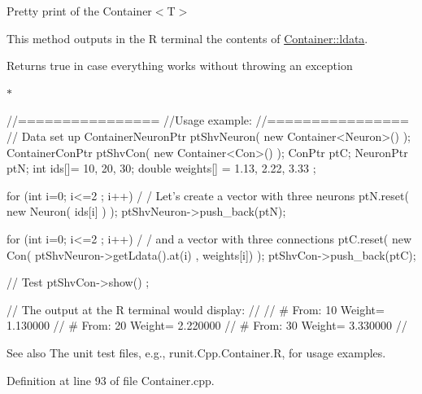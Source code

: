 Pretty print of the Container$<$T$>$ 

This method outputs in the R terminal the contents of \hyperlink{class_container_aef055b4e4f94e227cc8a2124af13c177}{Container::ldata}. \begin{DoxyReturn}{Returns}
true in case everything works without throwing an exception
\end{DoxyReturn}
$\ast$ 
\begin{DoxyCode}
                //================
                //Usage example:
                //================
                // Data set up
                        ContainerNeuronPtr      ptShvNeuron( new 
      Container<Neuron>() );
                        ContainerConPtr ptShvCon( new Container<Con>() );
                        ConPtr  ptC;
                        NeuronPtr ptN;
                        int ids[]= {10, 20, 30};
                        double weights[] = {1.13, 2.22, 3.33 };

                        for (int i=0; i<=2 ; i++) {                             /
      / Let's create a vector with three neurons
                                ptN.reset( new Neuron( ids[i] ) );
                                ptShvNeuron->push_back(ptN);
                        }

                        for (int i=0; i<=2 ; i++) {                             /
      / and a vector with three connections
                                ptC.reset( new Con( ptShvNeuron->getLdata().at(i)
      , weights[i]) );
                                ptShvCon->push_back(ptC);
                        }

                // Test
                        ptShvCon->show() ;

                // The output at the R terminal would display:
                //
                //      # From:  10      Weight=         1.130000
                //      # From:  20      Weight=         2.220000
                //      # From:  30      Weight=         3.330000
                //
\end{DoxyCode}


\begin{DoxySeeAlso}{See also}
The unit test files, e.g., runit.Cpp.Container.R, for usage examples. 
\end{DoxySeeAlso}


Definition at line 93 of file Container.cpp.


